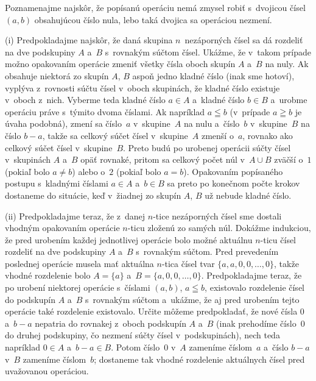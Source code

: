 {%
Poznamenajme najskôr, že popísanú operáciu nemá
zmysel robiť s~dvojicou čísel~$(a,b)$ obsahujúcou číslo nula,
lebo taká dvojica sa operáciou nezmení.

\smallskip
(i) Predpokladajme najskôr, že daná skupina $n$~nezáporných
čísel sa dá rozdeliť na dve podskupiny $A$ a~$B$ s~rovnakým súčtom
čísel. Ukážme, že v~takom prípade možno opakovaním operácie zmeniť
všetky čísla oboch skupín $A$ a~$B$ na nuly. Ak obsahuje niektorá
zo skupín $A$, $B$ aspoň jedno kladné číslo (inak sme hotoví),
vyplýva z~rovnosti súčtu čísel v~oboch skupinách, že kladné číslo
existuje v~oboch z~nich. Vyberme teda kladné číslo $a\in A$
a~kladné číslo $b\in B$ a~urobme operáciu práve s~týmito dvoma
číslami. Ak napríklad $a\leqq b$ (v~prípade $a\geqq b$ je
úvaha podobná), zmení sa číslo~$a$ v~skupine~$A$ na nulu
a~číslo~$b$ v~skupine~$B$ na číslo $b-a$, takže sa celkový
súčet čísel v~skupine~$A$ zmenší o~$a$, rovnako ako celkový
súčet čísel v~skupine~$B$. Preto budú po urobenej operácii
súčty čísel v~skupinách $A$ a~$B$ opäť rovnaké, pritom sa
celkový počet núl v~$A\cup B$ zväčší o~$1$ (pokiaľ bolo $a\ne b$)
alebo o~$2$ (pokiaľ bolo $a=b$).
Opakovaním popísaného postupu s~kladnými číslami $a\in A$ a~$b\in B$
sa preto po konečnom počte krokov dostaneme do situácie,
keď v~žiadnej zo skupín $A$, $B$ už nebude kladné číslo.

\smallskip
(ii) Predpokladajme teraz, že z~danej $n$-tice nezáporných čísel
sme dostali vhodným opakovaním operácie $n$-ticu zloženú zo
samých núl. Dokážme indukciou, že pred urobením každej jednotlivej
operácie bolo možné aktuálnu $n$-ticu čísel rozdeliť na dve
podskupiny $A$ a~$B$ s~rovnakým súčtom. Pred prevedením poslednej
operácie musela mať aktuálna $n$-tica čísel tvar
$\{a,a,0,0,\dots,0\}$, takže vhodné rozdelenie bolo $A=\{a\}$
a~$B=\{a,0,0,\dots,0\}$. Predpokladajme teraz, že po
urobení niektorej operácie s~číslami $(a,b)$, $a\leqq b$,
existovalo rozdelenie čísel do podskupín $A$ a~$B$ s~rovnakým
súčtom a~ukážme, že aj pred urobením tejto operácie
také rozdelenie existovalo. Určite môžeme predpokladať, že nové
čísla $0$ a~$b-a$ nepatria do rovnakej z~oboch podskupín $A$ a~$B$
(inak prehodíme číslo~$0$ do druhej podskupiny, čo nezmení
súčty čísel v~podskupinách), nech teda napríklad $0\in A$
a~$b-a\in B$. Potom číslo~$0$ v~$A$ zameníme číslom~$a$ a~číslo
$b-a$ v~$B$ zameníme číslom~$b$; dostaneme tak vhodné rozdelenie
aktuálnych čísel pred uvažovanou operáciou.}


